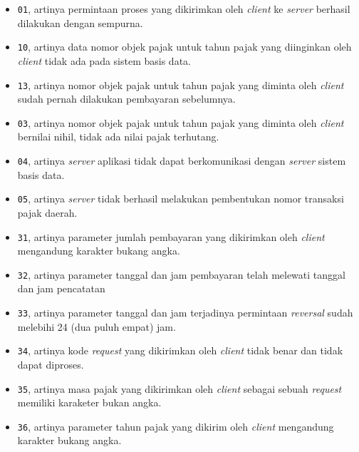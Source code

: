 \documentclass[pdftex,12pt, oneside]{article}
\begin{document}
\begin{itemize}
  \item \texttt{01}, artinya permintaan proses yang dikirimkan oleh \textit{client} ke \textit{server} berhasil dilakukan dengan sempurna.
  \item \texttt{10}, artinya data nomor objek pajak untuk tahun pajak yang diinginkan oleh \textit{client} tidak ada pada sistem basis data.
  \item \texttt{13}, artinya nomor objek pajak untuk tahun pajak yang diminta oleh \textit{client} sudah pernah dilakukan pembayaran sebelumnya.
  \item \texttt{03}, artinya nomor objek pajak untuk tahun pajak yang diminta oleh \textit{client} bernilai nihil, tidak ada nilai pajak terhutang.
  \item \texttt{04}, artinya \textit{server} aplikasi tidak dapat berkomunikasi dengan \textit{server} sistem basis data.
  \item \texttt{05}, artinya \textit{server} tidak berhasil melakukan pembentukan nomor transaksi pajak daerah.
  \item \texttt{31}, artinya parameter jumlah pembayaran yang dikirimkan oleh \textit{client} mengandung karakter bukang angka.
  \item \texttt{32}, artinya parameter tanggal dan jam pembayaran telah melewati tanggal dan jam pencatatan
  \item \texttt{33}, artinya parameter tanggal dan jam terjadinya permintaan \textit{reversal} sudah melebihi 24 (dua puluh empat) jam.
  \item \texttt{34}, artinya kode \textit{request} yang dikirimkan oleh \textit{client} tidak benar dan tidak dapat diproses.
  \item \texttt{35}, artinya masa pajak yang dikirimkan oleh \textit{client} sebagai sebuah \textit{request} memiliki karaketer bukan angka.
  \item \texttt{36}, artinya parameter tahun pajak yang dikirim oleh \textit{client} mengandung karakter bukang angka.
\end{itemize}
\end{document}
